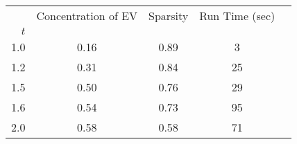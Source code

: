 \begin{tabular}{r|cccc}
\toprule
{} &  Concentration of EV &  Sparsity & Run Time (sec) \\
$t$ &                      &           &                \\
\midrule
1.0 &                 0.16 &      0.89 &              3 \\
1.2 &                 0.31 &      0.84 &             25 \\
1.5 &                 0.50 &      0.76 &             29 \\
1.6 &                 0.54 &      0.73 &             95 \\
2.0 &                 0.58 &      0.58 &             71 \\
\bottomrule
\end{tabular}

